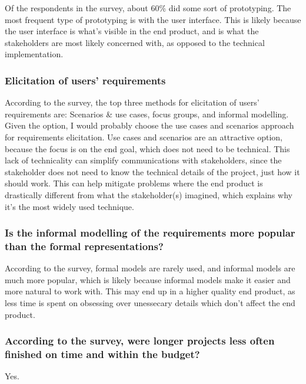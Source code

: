 \documentclass[letterpaper,12pt]{article}
\begin{document}
Of the respondents in the survey, about 60\% did some sort of prototyping.
The most frequent type of prototyping is with the user interface. This is likely
because the user interface is what's visible in the end product, and is what the
stakeholders are most likely concerned with, as opposed to the technical implementation.
\subsubsection{Elicitation of users' requirements}

According to the survey, the top three methods for
elicitation of users’ requirements are: Scenarios \& use cases, focus groups, and informal modelling.
Given the option, I would probably choose the use cases and scenarios approach for requirements
elicitation. Use cases and scenarios are an attractive option, because the focus is on the end goal,
which does not need to be technical. This lack of technicality can simplify communications with stakeholders,
since the stakeholder does not need to know the technical details of the project, just how it should work.
This can help mitigate problems where the end product is drastically different from what the stakeholder(s)
imagined, which explains why it's the most widely used technique.

\subsubsection{Is the informal modelling of the requirements more
 popular than the formal representations?}

According to the survey, formal models are rarely used, and informal models are
much more popular, which is likely because informal models make it easier and more
natural to work with. This may end up in a higher quality end product, as less time
is spent on obsessing over unessecary details which don't affect the end product.
\subsubsection{According to the survey, were longer projects less often finished on
 time and within the budget?}
Yes.
\end{document}
